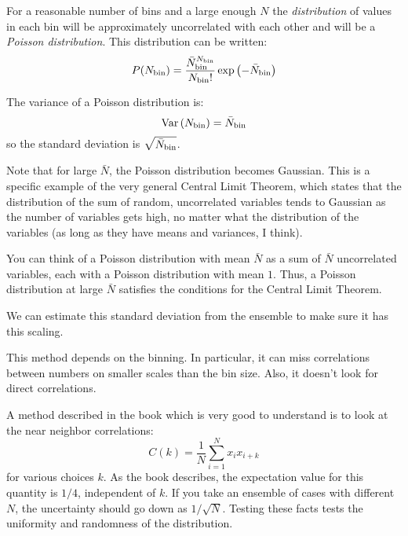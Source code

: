For a reasonable number of bins and a large enough $N$ the {\it
  distribution} of values in each bin will be approximately
uncorrelated with each other and will be a {\it Poisson
  distribution}. This distribution can be written:
\begin{equation}
P(N_{\rm bin}) = \frac{{\bar N}_{\rm bin}^{N_{\rm bin}}}{N_{\rm bin}!}
\exp\left(-  {\bar N}_{\rm bin}\right)
\end{equation}

The variance of a Poisson distribution is:
\begin{equation}
{\rm Var}\left(N_{\rm bin}\right) = {\bar N}_{\rm bin}
\end{equation}
so the standard deviation is $\sqrt{{\bar N}_{\rm bin}}$.

Note that for large $\bar N$, the Poisson distribution becomes
Gaussian.  This is a specific example of the very general Central
Limit Theorem, which states that the distribution of the sum of
random, uncorrelated variables tends to Gaussian as the number of
variables gets high, no matter what the distribution of the variables
(as long as they have means and variances, I think).


\begin{answer}
You can think of a Poisson distribution with mean $\bar N$ as a sum of
$\bar N$ uncorrelated variables, each with a Poisson distribution with
mean $1$.  Thus, a Poisson distribution at large $\bar N$ satisfies
the conditions for the Central Limit Theorem.
\end{answer}

We can estimate this standard deviation from the ensemble to make sure
it has this scaling. 

This method depends on the binning. In particular, it can miss
correlations between numbers on smaller scales than the bin
size. Also, it doesn't look for direct correlations. 

A method described in the book which is very good to understand is to
look at the near neighbor correlations: 
\begin{equation}
C(k) = \frac{1}{N} \sum_{i=1}^{N} x_i x_{i+k}
\end{equation}
for various choices $k$.  As the book describes, the expectation value
for this quantity is $1/4$, independent of $k$. If you take an
ensemble of cases with different $N$, the uncertainty should go down
as $1/\sqrt{N}$. Testing these facts tests the uniformity and
randomness of the distribution.

